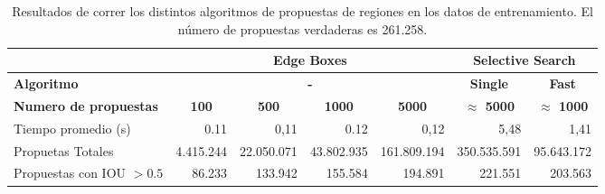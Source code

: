 \begin{table}[]
	\centering
	\resizebox{12.5cm}{!} {
		\begin{tabular}{|l|c|r|r|r|c|r|}
			\hline
			\textbf{}                     & \multicolumn{4}{c|}{\textbf{Edge Boxes}}                                                                                                   & \multicolumn{2}{c|}{\textbf{Selective Search}}               \\ \hline
			\textbf{Algoritmo}            & \multicolumn{4}{c|}{\textbf{-}}                                                                                                            & \textbf{Single}         & \multicolumn{1}{c|}{\textbf{Fast}} \\ \hline
			\textbf{Numero de propuestas} & \textbf{100}                 & \multicolumn{1}{c|}{\textbf{500}} & \multicolumn{1}{c|}{\textbf{1000}} & \multicolumn{1}{c|}{\textbf{5000}} & \textbf{$\approx$ 5000} & \multicolumn{1}{c|}{\textbf{$\approx$ 1000}}  \\ \hline
			Tiempo promedio (s)           & \multicolumn{1}{r|}{0.11}    & 0,11                              & 0.12                               & 0,12                               & \multicolumn{1}{r|}{5,48}   &         1,41                           \\ \hline
			Propuetas Totales             & \multicolumn{1}{r|}{4.415.244} & 22.050.071                          & 43.802.935                           & 161.809.194                          & \multicolumn{1}{r|}{350.535.591}   &   95.643.172                                 \\ \hline
			Propuestas con IOU $> 0.5$    & \multicolumn{1}{r|}{86.233}   & 133.942                            & 155.584                             & 194.891                             & \multicolumn{1}{r|}{221.551}   & 203.563                                   \\ \hline
		\end{tabular}
	}
	\caption{Resultados de correr los distintos algoritmos de propuestas de regiones en los datos de entrenamiento. El número de propuestas verdaderas es 261.258.}
	\label{tabla:edgeVSselct}
\end{table}


